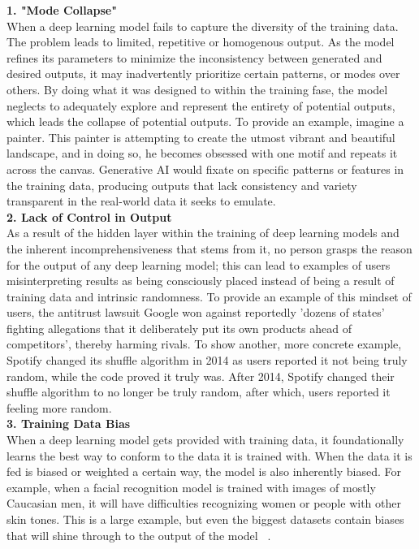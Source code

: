\documentclass[a4paper,12pt]{report}
\begin{document}
\textbf{1. "Mode Collapse"} ~\cite{GoogleGANProblems} \\
When a deep learning model fails to capture the diversity of the training data. The problem leads to limited, repetitive or homogenous output. As the model refines its parameters to minimize the inconsistency between generated and desired outputs, it may inadvertently prioritize certain patterns, or modes over others. By doing what it was designed to within the training fase, the model neglects to adequately explore and represent the entirety of potential outputs, which leads the collapse of potential outputs. To provide an example, imagine a painter. This painter is attempting to create the utmost vibrant and beautiful landscape, and in doing so, he becomes obsessed with one motif and repeats it across the canvas. Generative AI would fixate on specific patterns or features in the training data, producing outputs that lack consistency and variety transparent in the real-world data it seeks to emulate.\\

\textbf{2. Lack of Control in Output} ~\cite{google-antitrust}\\
As a result of the hidden layer within the training of deep learning models and the inherent incomprehensiveness that stems from it, no person grasps the reason for the output of any deep learning model; this can lead to examples of users misinterpreting results as being consciously placed instead of being a result of training data and intrinsic randomness. To provide an example of this mindset of users, the antitrust lawsuit Google won against reportedly 'dozens of states' fighting allegations that it deliberately put its own products ahead of competitors', thereby harming rivals. To show another, more concrete example, Spotify changed its shuffle algorithm in 2014 as users reported it not being truly random, while the code proved it truly was. After 2014, Spotify changed their shuffle algorithm to no longer be truly random, after which, users reported it feeling more random.~\cite{TheTab2023} ~\cite{HowToGeek2023}\\

\textbf{3. Training Data Bias} ~\cite{Lessons}\\
When a deep learning model gets provided with training data, it foundationally learns the best way to conform to the data it is trained with. When the data it is fed is biased or weighted a certain way, the model is also inherently biased. For example, when a facial recognition model is trained with images of mostly Caucasian men, it will have difficulties recognizing women or people with other skin tones. This is a large example, but even the biggest datasets contain biases that will shine through to the output of the model ~\cite{Biases}.\\
\end{document}
